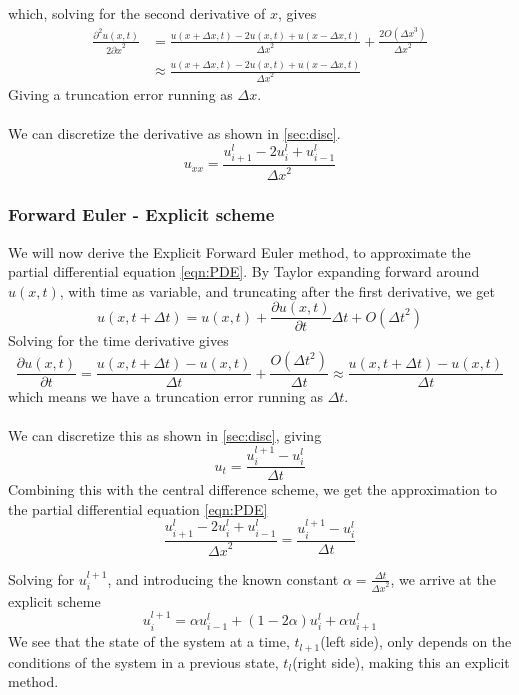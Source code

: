 \documentclass[10pt,a4paper]{article}
\newcommand{\dt}{{\Delta t}}
\newcommand{\dx}{{\Delta x}}
\newcommand{\pt}{{\partial t}}
\newcommand{\px}{{\partial x}}
\newcommand{\pu}{{\partial u}}
\newcommand{\ppu}{{\partial^2 u}}
\begin{document}
which, solving for the second derivative of $x$, gives
\begin{equation}\begin{split}
\frac{\ppu(x,t)}{2\px^2} &= \frac{u(x+\Delta x, t) - 2u(x,t) + u(x-\Delta x, t)}{\dx^2} + \frac{2O(\dx^3)}{\dx^2}\\
&\approx \frac{u(x+\Delta x, t) - 2u(x,t) + u(x-\Delta x, t)}{\dx^2}
\end{split}\end{equation}
Giving a truncation error running as $\dx$.\\\\
We can discretize the derivative as shown in \ref{sec:disc}.
\begin{equation}
u_{xx} = \frac{u_{i+1}^l - 2u_i^l+u_{i-1}^l}{\dx^2}
\end{equation}




\subsubsection{Forward Euler - Explicit scheme}
We will now derive the Explicit Forward Euler method, to approximate the partial differential equation \ref{eqn:PDE}. By Taylor expanding forward around $u(x,t)$, with time as variable, and truncating after the first derivative, we get
\begin{equation}
u(x,t+\dt) = u(x,t) + \frac{\pu(x,t)}{\pt}\dt + O(\dt^2)
\end{equation}
Solving for the time derivative gives
\begin{equation}
\frac{\pu(x,t)}{\pt} = \frac{u(x,t+\dt) - u(x,t)}{\dt} + \frac{O(\dt^2)}{\dt} \approx \frac{u(x,t+\dt) - u(x,t)}{\dt}
\end{equation}
which means we have a truncation error running as $\dt$.
\\\\
We can discretize this as shown in \ref{sec:disc}, giving
\begin{equation}
u_t = \frac{u_i^{l+1} - u_i^l}{\dt}
\end{equation}
Combining this with the central difference scheme, we get the approximation to the partial differential equation \vref{eqn:PDE}
\begin{equation}
\frac{u_{i+1}^l - 2u_i^l+u_{i-1}^l}{\dx^2} = \frac{u_i^{l+1} - u_i^l}{\dt}
\end{equation}

Solving for $u_i^{l+1}$, and introducing the known constant $\alpha = \frac{\dt}{\dx^2}$, we arrive at the explicit scheme
\begin{equation}\label{eq:1dscheme:fe}
u_i^{l+1} = \alpha u_{i-1}^l + (1-2\alpha)u_i^l + \alpha u_{i+1}^l
\end{equation}
We see that the state of the system at a time, $t_{l+1}$(left side), only depends on the conditions of the system in a previous state, $t_l$(right side), making this an explicit method.
\end{document}
